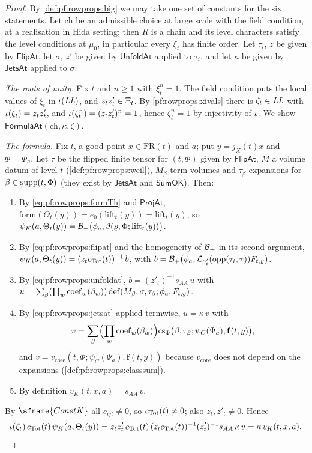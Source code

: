 \begin{proof}
By \cref{def:pf:rowprops:big} we may take one set of constants for the six statements. Let $\mathrm{ch}$ be an
admissible choice at large scale with the field condition, at a realisation in Hida setting; then $R$ is a chain and its
level characters satisfy the level conditions at $\mu_0$, in particular every $\xi_t$ has finite order. Let
$\tau_i$, $z$ be given by $\mathsf{FlipAt}$, let $\sigma$, $z'$ be given by $\mathsf{UnfoldAt}$ applied to $\tau_i$, and let
$\kappa$ be given by $\mathsf{JetsAt}$ applied to $\sigma$.

\emph{The roots of unity.} Fix $t$ and $n\ge1$ with $\xi_t^n=1$. The field condition puts the local values of $\xi_t$ in
$\iota(\mathit{LL})$, and $z_tz'_t\in\Xi_t$. By \cref{pf:rowprops:xivals} there is $\zeta_t\in\mathit{LL}$
with $\iota(\zeta_t)=z_tz'_t$, and $\iota(\zeta_t^n)=(z_tz'_t)^n=1$, hence $\zeta_t^n=1$ by injectivity of
$\iota$. We show $\mathsf{FormulaAt}(\mathrm{ch},\kappa,\zeta)$.

\emph{The formula.} Fix $t$, a good point $x\in\mathrm{FR}(t)$ and $a$; put $y=j_X(t)x$ and $\Phi=\Phi_a$. Let $\tau$ be the
flipped finite tensor for $(t,\Phi)$ given by $\mathsf{FlipAt}$, $M$ a volume datum of level $t$
(\cref{def:pf:rowprops:weil}), $M_\beta$ term volumes and $\tau_\beta$ expansions for $\beta\in\mathrm{supp}(t,\Phi)$ (they
exist by $\mathsf{JetsAt}$ and $\mathsf{SumOK}$). Then:
\begin{enumerate}[label=(\roman*)]
\item By \eqref{eq:pf:rowprops:formTh} and $\mathsf{ProjAt}$, $\mathrm{form}(\Theta_t(y))=e_0(\mathrm{lift}_t(y))=\mathrm{lift}_t(y)$, so
$\psi_K(a,\Theta_t(y))=\mathcal{B}_+\bigl(\phi_a,\vartheta(\varrho,\Phi;\mathrm{lift}_t(y))\bigr)$.
\item By \eqref{eq:pf:rowprops:flipat} and the homogeneity of $\mathcal{B}_+$ in its second argument,
$\psi_K(a,\Theta_t(y))=(z_tc_{\mathrm{Tot}}(t))^{-1}\,b$, with $b=\mathcal{B}_+\bigl(\phi_a,\mathcal{L}_{\gamma'_t}(\mathrm{opp}(\tau_i,\tau))F_{t,y}\bigr)$.
\item By \eqref{eq:pf:rowprops:unfoldat}, $b=(z'_t)^{-1}s_{AA}\,u$ with $u=\sum_\beta(\prod_w\mathrm{coef}_w(\beta_w))\,
\mathrm{def}(M_\beta;\sigma,\tau_\beta;\phi_a,F_{t,y})$.
\item By \eqref{eq:pf:rowprops:jetsat} applied termwise, $u=\kappa\,v$ with
\[
v=\sum_\beta\Bigl(\prod_w\mathrm{coef}_w(\beta_w)\Bigr)\mathrm{cs}_\Phi\bigl(\beta,\tau_\beta;\psi_C(\Psi_a),\mathbf{f}(t,y)\bigr),
\]
and $v=v_{\mathrm{core}}(t,\Phi;\psi_C(\Psi_a),\mathbf{f}(t,y))$ because $v_{\mathrm{core}}$ does not depend on the
expansions (\cref{def:pf:rowprops:classsum}).
\item By definition $v_K(t,x,a)=s_{AA}\,v$.
\end{enumerate}
By $\sfname{ConstK}$ all $c_{ijt}\neq0$, so $c_{\mathrm{Tot}}(t)\ne0$; also $z_t,z'_t\ne0$. Hence
\[
\iota(\zeta_t)\,c_{\mathrm{Tot}}(t)\,\psi_K(a,\Theta_t(y))=z_tz'_t\,c_{\mathrm{Tot}}(t)\,(z_tc_{\mathrm{Tot}}(t))^{-1}(z'_t)^{-1}s_{AA}\,\kappa\,v
=\kappa\,v_K(t,x,a).\qedhere
\]
\end{proof}

